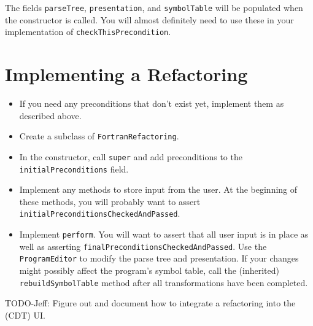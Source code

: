 The fields \texttt{parseTree}, \texttt{presentation}, and \texttt{symbolTable}
will be populated when the constructor is called.  You will almost definitely
need to use these in your implementation of \texttt{checkThisPrecondition}.

\section{Implementing a Refactoring}

\begin{itemize}

\item If you need any preconditions that don't exist yet, implement them
      as described above.

\item Create a subclass of \texttt{FortranRefactoring}.

\item In the constructor, call \texttt{super} and add preconditions
      to the \texttt{initialPreconditions} field.

\item Implement any methods to store input from the user.  At the beginning
      of these methods, you will probably want to assert
      \texttt{initialPreconditionsCheckedAndPassed}.

\item Implement \texttt{perform}.  You will want to assert that all user
      input is in place as well as asserting
      \texttt{finalPreconditionsCheckedAndPassed}.  Use the
      \texttt{ProgramEditor} to modify the parse tree and presentation.
      If your changes might possibly affect the program's symbol table,
      call the (inherited) \texttt{rebuildSymbolTable} method after all
      transformations have been completed.

\end{itemize}

TODO-Jeff: Figure out and document how to integrate a refactoring into the
(CDT) UI.
